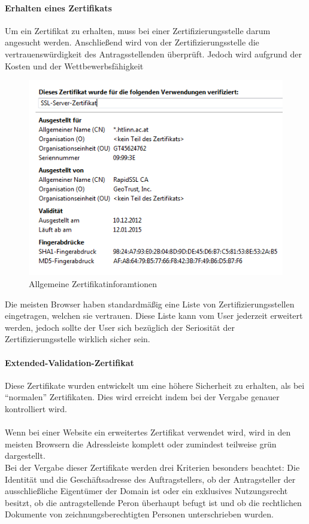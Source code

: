\paragraph{Erhalten eines Zertifikats}
Um ein Zertifikat zu erhalten, muss bei einer Zertifizierungsstelle darum angesucht werden. Anschließend wird von der Zertifizierungsstelle die vertrauenswürdigkeit des Antragsstellenden überprüft. Jedoch wird aufgrund der Kosten und der Wettbewerbsfähigkeit
\begin{figure}[H]
\centering
\includegraphics[keepaspectratio=true, width=12cm]{images/screenshots/certificate.png}
\caption{Allgemeine Zertifikatinforamtionen}
\label{fig:certificate}
\end{figure}
Die meisten Browser haben standardmäßig eine Liste von Zertifizierungsstellen eingetragen, welchen sie vertrauen. Diese Liste kann vom User jederzeit erweitert werden, jedoch sollte der User sich bezüglich der Seriosität der Zertifizierungsstelle wirklich sicher sein. 
\paragraph{Extended-Validation-Zertifikat}
Diese Zertifikate wurden entwickelt um eine höhere Sicherheit zu erhalten, als bei \enquote{normalen} Zertifikaten. Dies wird erreicht indem bei der Vergabe genauer kontrolliert wird. \\\\
Wenn bei einer Website ein erweitertes Zertifikat verwendet wird, wird in den meisten Browsern die Adressleiste komplett oder zumindest teilweise grün dargestellt.
\\
Bei der Vergabe dieser Zertifikate werden drei Kriterien besonders beachtet:
Die Identität und die Geschäftsadresse des Auftragstellers, ob der Antragsteller der ausschließliche Eigentümer der Domain ist oder ein exklusives Nutzungsrecht besitzt, ob die antragstellende Peron überhaupt befugt ist und ob die rechtlichen Dokumente von zeichnungsberechtigten Personen unterschrieben wurden.

